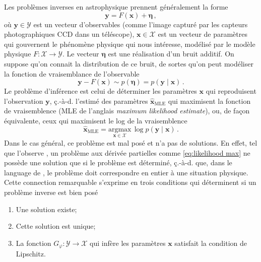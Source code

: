 Les problèmes inverses en astrophysique prennent généralement la forme
\begin{equation}\label{eq:inverse problem lineaire}
       \mathbf{y} = F(\mathbf{x}) + \boldsymbol{\eta}\, ,
\end{equation} 
où $\mathbf{y}\in \mathcal{Y}$ est un vecteur d'observables (comme l'image capturé par les capteurs photographiques CCD dans un téléscope), 
$\mathbf{x}\in\mathcal{X}$ est un vecteur de paramètres qui gouvernent le phénomène physique qui nous intéresse, 
modélisé par le modèle physique $F:\mathcal{X} \rightarrow \mathcal{Y}$.
Le vecteur $\boldsymbol{\eta}$ est une réalisation d'un bruit additif. 
On suppose qu'on connait la distribution de ce bruit, de sortes qu'on peut modéliser la fonction de vraisemblance de l'observable
\begin{equation}\label{eq:likelihood intro}
        \mathbf{y} - F(\mathbf{x}) \sim p(\boldsymbol{ \eta}) = p(\mathbf{y} \mid \mathbf{x})\, .
\end{equation} 
Le problème d'inférence est celui de déterminer les paramètres $\mathbf{x}$ qui reproduisent l'observation $\mathbf{y}$, 
ç.-à-d. l'estimé des paramètres $\hat{\mathbf{x}}_{\mathrm{MLE}}$ 
qui maximisent la fonction de vraisemblence (MLE de l'anglais \textit{maximum likelihood estimate}), 
ou, de façon équivalente, ceux qui maximisent le log de la vraisemblence
\begin{equation}\label{eq:likelihood max}
        \hat{\mathbf{x}}_{\mathrm{MLE}} = \underset{\mathbf{x} \in \mathcal{X}}{\mathrm{argmax}}\, \log p(\mathbf{y} \mid \mathbf{x})\, .
\end{equation} 
Dans le cas général, ce problème est mal posé et n'a pas de solutions. En effet, 
tel que l'observe \citet{Hadamard1902}, un problème aux dérivée partielles comme \eqref{eq:likelihood max} 
ne possède une solution que si le problème est déterminé, ç.-à-d. que, dans le language de \citet{Hadamard1902}, 
le problème doit correspondre en entier à une situation physique. Cette connection remarquable s'exprime en trois conditions qui déterminent 
si un problème inverse est bien posé
\begin{enumerate}[label=(\subscript{H}{{\arabic*}})]
        \item \label{hadamard:1}Une solution existe;
        \item \label{hadamard:2}Cette solution est unique;
        \item \label{hadamard:3} La fonction $G_\varphi: \mathcal{Y} \rightarrow \mathcal{X}$ 
                qui infère les paramètres $\mathbf{x}$ satisfait la condition de Lipschitz.
\end{enumerate}
